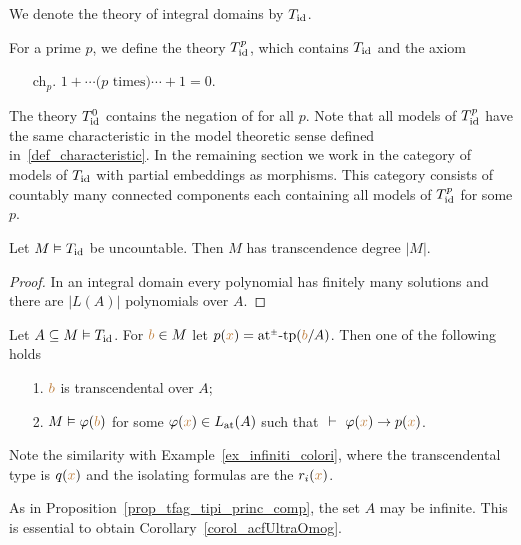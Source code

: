 We denote the theory  of integral domains by \emph{$T_{\rm id}$}.

For a prime $p$, we define the theory \emph{$T^p_{\rm id}$}, which contains $T_{\rm id}$ and the axiom
\begin{itemize}
\item[ch$_p$.]$1+\cdots \mbox{($p$ times)}\cdots +1=0$.
\end{itemize}
The theory \emph{$T^0_{\rm id}$\/} contains the negation of  for all $p$.
%
Note that all models of $T^p_{\rm id}$ have the same characteristic in the model theoretic sense defined in~\ref{def_characteristic}.
%
In the remaining section we work in the category of models of $T_{\rm id}$ with partial embeddings as morphisms.
%
This category consists of countably many connected components each containing all models of $T^p_{\rm id}$ for some $p$.


\begin{proposition}\label{prop_uncontable_trascendente}
Let $M\models T_{\rm id}$ be uncountable.
%
Then $M$ has transcendence degree $|M|$.
\end{proposition}

\begin{proof}
In an integral domain every polynomial has finitely many solutions and there are $|L(A)|$ polynomials over $A$.
\end{proof}


\begin{proposition}\label{prop_di_tipi_princ_comp}
Let $A\subseteq M\models T_{\rm id}$.
%
For ${\mr b}\in M$ let $p({\mr x})=\atpmtp({\mr b}/A)$.
%
Then one of the following holds  
\begin{itemize}
\item[1.] ${\mr b}$ is transcendental over $A$;
\item[2.] $M\models\phi({\mr b})$ for some $\phi({\mr x})\in L_{\rm at}(A)$ such that
$\ \proves\ \phi({\mr x})\imp p({\mr x})$.
\end{itemize}
\end{proposition}

Note the similarity with Example~\ref{ex_infiniti_colori}, where the transcendental type is $q({\mr x})$ and the isolating formulas are the $r_i({\mr x})$.

As in Proposition~\ref{prop_tfag_tipi_princ_comp}, the set $A$ may be infinite.
%
This is essential to obtain Corollary~\ref{corol_acfUltraOmog}.

